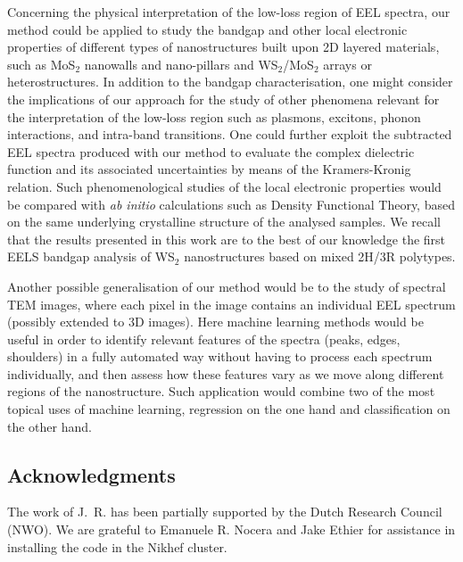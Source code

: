 Concerning the physical interpretation of the low-loss region of EEL
spectra, our method could be applied to study the bandgap
and other local electronic properties of different types
of nanostructures built upon 2D layered materials, such as MoS$_2$ nanowalls
and nano-pillars and WS$_2$/MoS$_2$ arrays or heterostructures.
%
In addition to the bandgap characterisation, one might
consider the implications of our approach for the study
of other phenomena relevant for the interpretation of the low-loss
region such as  plasmons, excitons, phonon interactions, and
intra-band transitions.
%
One could   further exploit the subtracted EEL spectra produced
with our method to evaluate the complex dielectric function and its associated
uncertainties by means of the Kramers-Kronig relation.
%
Such phenomenological studies of the local electronic properties would be compared
with {\it ab initio} calculations such as Density Functional Theory, based
on the same underlying crystalline structure of the analysed samples.
%
We recall that the results
presented in this work are to the best of our knowledge the first EELS bandgap
analysis of WS$_2$ nanostructures based on mixed 2H/3R polytypes.

Another possible generalisation of our method would be to the study of spectral TEM images,
where each pixel in the image contains an individual EEL spectrum (possibly
extended to 3D images).
%
Here machine learning methods would be useful in order
to  identify relevant features of the spectra (peaks, edges, shoulders) in a fully
automated way
without having to process each spectrum individually, and then assess
how these features vary as we move along different regions of the
nanostructure.
%
Such application would combine two of the most topical uses of machine learning, regression
on the one hand and classification on the other hand.

\subsection*{Acknowledgments}
%
The work of J.~R. has been partially supported by the
Dutch Research Council (NWO).
%
We are grateful to Emanuele R. Nocera and Jake Ethier for
assistance in installing the code in the Nikhef cluster.

